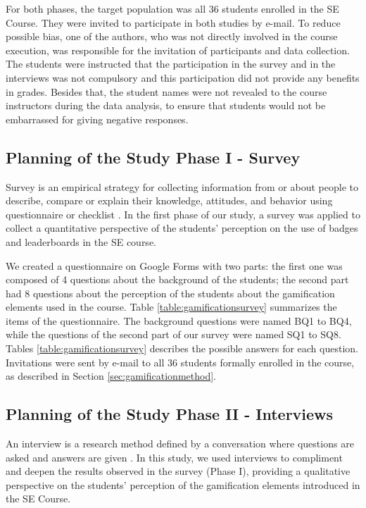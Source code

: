For both phases, the target population was all 36 students enrolled in the SE Course. They were invited to participate in both studies by e-mail. To reduce possible bias, one of the authors, who was not directly involved in the course execution, was responsible for the invitation of participants and data collection. The students were instructed that the participation in the survey and in the interviews was not compulsory and this participation did not provide any benefits in grades. Besides that, the student names were not revealed to the course instructors during the data analysis, to ensure that students would not be embarrassed for giving negative responses.

\subsection{Planning of the Study Phase I - Survey}
\label{sec:gamificationsurvey}

Survey is an empirical strategy for collecting information from or about people to describe, compare or explain their knowledge, attitudes, and behavior using questionnaire or checklist \citep{Pfleeger:2001}. In the first phase of our study, a survey was applied to collect a quantitative perspective of the students’ perception on the use of badges and leaderboards in the SE course. 

We created a questionnaire on Google Forms  with two parts: the first one was composed of 4 questions about the background of the students; the second part had 8 questions about the perception of the students about the gamification elements used in the course. Table \ref{table:gamificationsurvey} summarizes the items of the questionnaire. The background questions were named BQ1 to BQ4, while the questions of the second part of our survey were named SQ1 to SQ8. Tables \ref{table:gamificationsurvey} describes the possible answers for each question. Invitations were sent by e-mail to all 36 students formally enrolled in the course, as described in Section \ref{sec:gamificationmethod}.



\subsection{Planning of the Study Phase II - Interviews}
\label{sec:gamificationinterview}

An interview is a research method defined by a conversation where questions are asked and answers are given \citep{Wohlin:2012}. In this study, we used interviews to compliment and deepen the results observed in the survey (Phase I), providing a qualitative perspective on the students’ perception of the gamification elements introduced in the SE Course.

